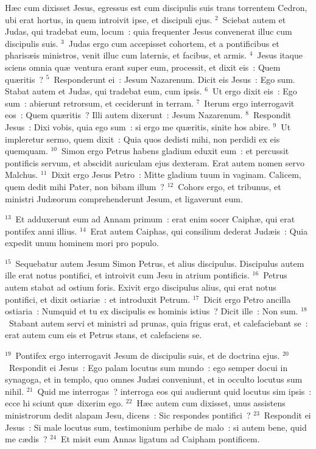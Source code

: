 \lettrine[lines=10,image=true,loversize=0.05,lraise=-0.03]{H}{}\ae c cum dixisset Jesus, egressus est cum discipulis suis trans torrentem Cedron, ubi erat hortus, in quem introivit ipse, et discipuli ejus.
${}^{2}$~Sciebat autem et Judas, qui tradebat eum, locum~: quia frequenter Jesus convenerat illuc cum discipulis suis.
${}^{3}$~Judas ergo cum accepisset cohortem, et a pontificibus et pharis\ae is ministros, venit illuc cum laternis, et facibus, et armis.
${}^{4}$~Jesus itaque sciens omnia qu\ae\ ventura erant super eum, processit, et dixit eis~: Quem qu\ae ritis~?
${}^{5}$~Responderunt ei~: Jesum Nazarenum. Dicit eis Jesus~: Ego sum. Stabat autem et Judas, qui tradebat eum, cum ipsis.
${}^{6}$~Ut ergo dixit eis~: Ego sum~: abierunt retrorsum, et ceciderunt in terram.
${}^{7}$~Iterum ergo interrogavit eos~: Quem qu\ae ritis~? Illi autem dixerunt~: Jesum Nazarenum.
${}^{8}$~Respondit Jesus~: Dixi vobis, quia ego sum~: si ergo me qu\ae ritis, sinite hos abire.
${}^{9}$~Ut impleretur sermo, quem dixit~: Quia quos dedisti mihi, non perdidi ex eis quemquam.
${}^{10}$~Simon ergo Petrus habens gladium eduxit eum~: et percussit pontificis servum, et abscidit auriculam ejus dexteram. Erat autem nomen servo Malchus.
${}^{11}$~Dixit ergo Jesus Petro~: Mitte gladium tuum in vaginam. Calicem, quem dedit mihi Pater, non bibam illum~?
${}^{12}$~Cohors ergo, et tribunus, et ministri Jud\ae orum comprehenderunt Jesum, et ligaverunt eum.


${}^{13}$~Et adduxerunt eum ad Annam primum~: erat enim socer Caiph\ae , qui erat pontifex anni illius.
${}^{14}$~Erat autem Caiphas, qui consilium dederat Jud\ae is~: Quia expedit unum hominem mori pro populo.


${}^{15}$~Sequebatur autem Jesum Simon Petrus, et alius discipulus. Discipulus autem ille erat notus pontifici, et introivit cum Jesu in atrium pontificis.
${}^{16}$~Petrus autem stabat ad ostium foris. Exivit ergo discipulus alius, qui erat notus pontifici, et dixit ostiari\ae~: et introduxit Petrum.
${}^{17}$~Dicit ergo Petro ancilla ostiaria~: Numquid et tu ex discipulis es hominis istius~? Dicit ille~: Non sum.
${}^{18}$~Stabant autem servi et ministri ad prunas, quia frigus erat, et calefaciebant se~: erat autem cum eis et Petrus stans, et calefaciens se.


${}^{19}$~Pontifex ergo interrogavit Jesum de discipulis suis, et de doctrina ejus.
${}^{20}$~Respondit ei Jesus~: Ego palam locutus sum mundo~: ego semper docui in synagoga, et in templo, quo omnes Jud\ae i conveniunt, et in occulto locutus sum nihil.
${}^{21}$~Quid me interrogas~? interroga eos qui audierunt quid locutus sim ipsis~: ecce hi sciunt qu\ae\ dixerim ego.
${}^{22}$~H\ae c autem cum dixisset, unus assistens ministrorum dedit alapam Jesu, dicens~: Sic respondes pontifici~?
${}^{23}$~Respondit ei Jesus~: Si male locutus sum, testimonium perhibe de malo~: si autem bene, quid me c\ae dis~?
${}^{24}$~Et misit eum Annas ligatum ad Caipham pontificem.


